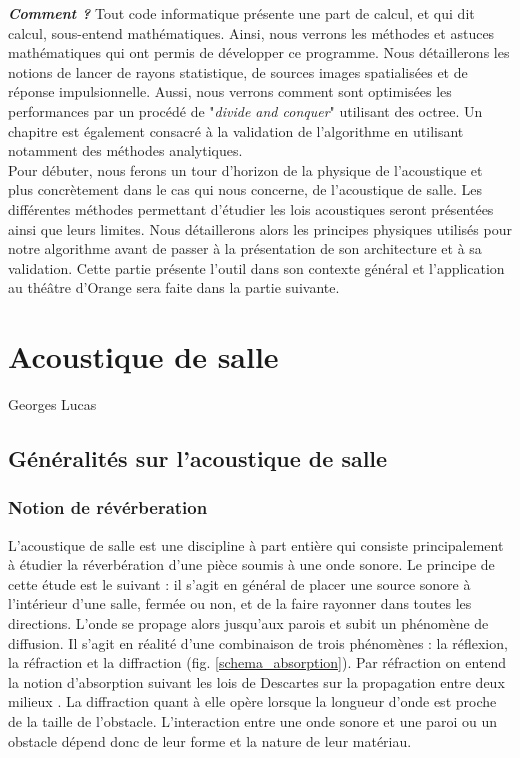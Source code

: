 \textit{\textbf{Comment ?}} Tout code informatique présente une part de calcul, et qui dit calcul, sous-entend mathématiques. Ainsi, nous verrons les méthodes et astuces mathématiques qui ont permis de développer ce programme. Nous détaillerons les notions de lancer de rayons statistique, de sources images spatialisées et de réponse impulsionnelle. Aussi, nous verrons comment sont optimisées les performances par un procédé de "\textit{divide and conquer}" utilisant des \gls{octree}. Un chapitre est également consacré à la validation de l'algorithme en utilisant notamment des méthodes analytiques.\\

Pour débuter, nous ferons un tour d'horizon de la physique de l'acoustique et plus concrètement dans le cas qui nous concerne, de l'acoustique de salle. Les différentes méthodes permettant d'étudier les lois acoustiques seront présentées ainsi que leurs limites. Nous détaillerons alors les principes physiques utilisés pour notre algorithme avant de passer à la présentation de son architecture et à sa validation. Cette partie présente l'outil dans son contexte général et l'application au théâtre d'Orange sera faite dans la partie suivante.







\chapter{Acoustique de salle}
			{Georges Lucas}
		\minitoc
		\newpage
			
		
\section{Généralités sur l'acoustique de salle}
\subsection{Notion de révérberation}
L'acoustique de salle est une discipline à part entière qui consiste principalement à étudier la réverbération d'une pièce soumis à une onde sonore. Le principe de cette étude est le suivant : il s'agit en général de placer une source sonore à l'intérieur d'une salle, fermée ou non, et de la faire rayonner dans toutes les directions. L'onde se propage alors jusqu'aux parois et subit un phénomène de diffusion. Il s'agit en réalité d'une combinaison de trois phénomènes : la réflexion, la réfraction et la diffraction (fig. \ref{schema_absorption}). Par réfraction on entend la notion d'absorption suivant les lois de Descartes sur la propagation entre deux milieux \cite[p. 3]{jouhaneau}. La diffraction quant à elle opère lorsque la longueur d'onde est proche de la taille de l'obstacle. L'interaction entre une onde sonore et une paroi ou un obstacle dépend donc de leur forme et la nature de leur matériau.

